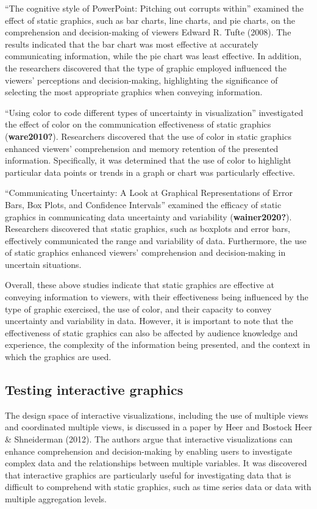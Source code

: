 \documentclass[print]{nuthesis}
\begin{document}
``The cognitive style of PowerPoint: Pitching out corrupts within'' examined the effect of static graphics, such as bar charts, line charts, and pie charts, on the comprehension and decision-making of viewers Edward R. Tufte (2008).
The results indicated that the bar chart was most effective at accurately communicating information, while the pie chart was least effective.
In addition, the researchers discovered that the type of graphic employed influenced the viewers' perceptions and decision-making, highlighting the significance of selecting the most appropriate graphics when conveying information.

``Using color to code different types of uncertainty in visualization'' investigated the effect of color on the communication effectiveness of static graphics (\textbf{ware2010?}).
Researchers discovered that the use of color in static graphics enhanced viewers' comprehension and memory retention of the presented information.
Specifically, it was determined that the use of color to highlight particular data points or trends in a graph or chart was particularly effective.

``Communicating Uncertainty: A Look at Graphical Representations of Error Bars, Box Plots, and Confidence Intervals'' examined the efficacy of static graphics in communicating data uncertainty and variability (\textbf{wainer2020?}).
Researchers discovered that static graphics, such as boxplots and error bars, effectively communicated the range and variability of data.
Furthermore, the use of static graphics enhanced viewers' comprehension and decision-making in uncertain situations.

Overall, these above studies indicate that static graphics are effective at conveying information to viewers, with their effectiveness being influenced by the type of graphic exercised, the use of color, and their capacity to convey uncertainty and variability in data.
However, it is important to note that the effectiveness of static graphics can also be affected by audience knowledge and experience, the complexity of the information being presented, and the context in which the graphics are used.

\hypertarget{testing-interactive-graphics}{%
\subsection{Testing interactive graphics}\label{testing-interactive-graphics}}

The design space of interactive visualizations, including the use of multiple views and coordinated multiple views, is discussed in a paper by Heer and Bostock Heer \& Shneiderman (2012).
The authors argue that interactive visualizations can enhance comprehension and decision-making by enabling users to investigate complex data and the relationships between multiple variables.
It was discovered that interactive graphics are particularly useful for investigating data that is difficult to comprehend with static graphics, such as time series data or data with multiple aggregation levels.
\end{document}
